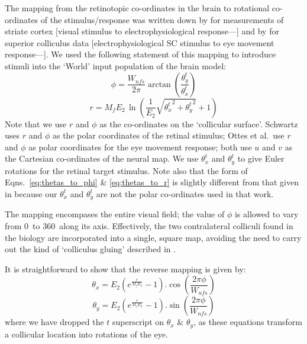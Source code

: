 \documentclass{frontiersSCNS}
\begin{document}
The mapping from the retinotopic co-ordinates in the brain to rotational
co-ordinates of the stimulus/response was written down by
\cite{schwartz_spatial_1977,eric_l._schwartz_computational_1980}
for measurements of
striate cortex [visual stimulus to electrophysiological response---\cite{daniel_representation_1961, talbot_physiological_1941}]
and by \cite{ottes_visuomotor_1986} for superior colliculus data
[electrophysiological SC stimulus to eye movement
response---\cite{robinson_eye_1972}].
We used the following statement of this mapping to introduce stimuli
into the `World' input population of the brain model:
\begin{equation}\label{eq:thetas_to_phi}
   \phi = \frac{W_{nfs}} {2 \pi}\arctan\left(\frac{\theta_{y}^{t}}{\theta_{x}^{t}}\right)
\end{equation}
\begin{equation}\label{eq:thetas_to_r}
   r = M_fE_2\,\ln\left(\frac{1}{E_2}\sqrt{{\theta_{x}^{t}}^2 + {\theta_{y}^{t}}^2}+1\right)
\end{equation}
Note that we use $r$ and $\phi$ as the co-ordinates on the `collicular
surface'. Schwartz uses $r$ and $\phi$ as the polar coordinates of the
retinal stimulus; Ottes et al.~use $r$ and $\phi$ as polar coordinates
for the eye movement response; both use $u$ and $v$ as the Cartesian co-ordinates of the neural map. We use $\theta_{x}^{t}$ and $\theta_{y}^{t}$
to give Euler rotations for the retinal target stimulus. Note also that
the form of Eqns.~\ref{eq:thetas_to_phi} \& \ref{eq:thetas_to_r} is slightly
different from that given in
\cite{ottes_visuomotor_1986} because our $\theta_{x}^{t}$ and
$\theta_{y}^{t}$ are not the polar co-ordinates used in that work.

The mapping encompases the entire visual field; the value of
$\phi$ is allowed to vary from 0\dg~to 360\dg~along its axis.
Effectively, the two contralateral colliculi found in the biology are
incorporated into a
single, square map, avoiding the need to carry out the kind of `colliculus
gluing' described in \cite{tabareau_geometry_2007}.

It is straightforward to show that the reverse mapping is given by:
\begin{equation}
   \theta_x = E_2 \left(e^{\frac{r}{M_f E_2}} - 1\right).\cos\left(\frac{2 \pi \phi}{W_{nfs}}\right)
\end{equation}
\begin{equation}
   \theta_y = E_2 \left(e^{\frac{r}{M_f E_2}} - 1\right).\sin\left(\frac{2 \pi \phi}{W_{nfs}}\right)
\end{equation}
where we have dropped the $t$ superscript on $\theta_x$ \& $\theta_y$, as
these equations transform a collicular location into rotations of the eye.
\end{document}
